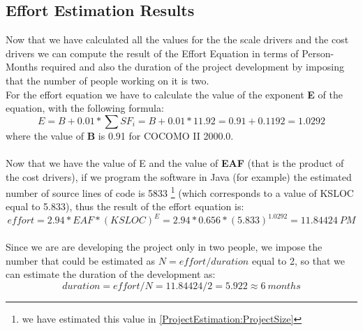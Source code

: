 \documentclass[\mainpath/main]{subfiles}
\begin{document}
\subsection{Effort Estimation Results}
Now that we have calculated all the values for the the scale drivers and the cost drivers we can compute the result of the Effort Equation in terms of Person-Months required and also the duration of the project development by imposing that the number of people working on it is two.\\
For the effort equation we have to calculate the value of the exponent \textbf{E} of the equation, with the following formula:
\[
E = B + 0.01 * \sum SF_{i} = B + 0.01 * 11.92 = 0.91 + 0.1192 = 1.0292
\]
where the value of \textbf{B} is 0.91 for COCOMO II 2000.0.\\
\\
Now that we have the value of E and the value of \textbf{EAF} (that is the product of the cost drivers), if we program the software in Java (for example) the estimated number of source lines of code is 5833 \footnote{we have estimated this value in \autoref{ProjectEstimation:ProjectSize}} (which corresponds to a value of KSLOC equal to 5.833), thus the result of the effort equation is:
\[
effort = 2.94 * EAF * (KSLOC)^E = 2.94 * 0.656 * (5.833)^{1.0292} = 11.84424\ PM
\]
\\
Since we are are developing the project only in two people, we impose the number that could be estimated as $N = effort / duration$ equal to 2, so that we can estimate the duration of the development as:
\[
duration = effort / N = 11.84424 / 2 = 5.922 \approx 6\ months
\]
\end{document}
